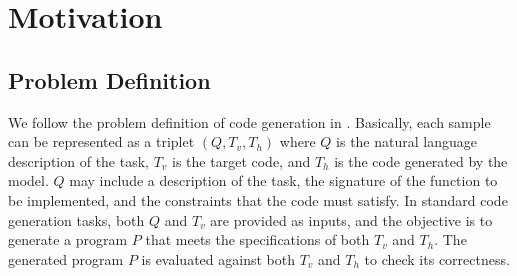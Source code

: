 
\section{Motivation}

\subsection{Problem Definition}

We follow the problem definition of code generation in \cite{TeachSelfDebug}. Basically, each sample
can be represented as a triplet $(Q, T_v, T_h)$ where $Q$ is the natural language description of the task, $T_v$ is the target code, and $T_h$ is the code generated by the model. $Q$ may include a description of the task, the signature of the function to be implemented, and the constraints that the code must satisfy. In standard code generation tasks, both $Q$ and $T_v$ are provided as inputs, and the objective is to generate a program $P$ that meets the specifications of both $T_v$ and $T_h$. The generated program $P$ is evaluated against both $T_v$ and $T_h$ to check its correctness.



